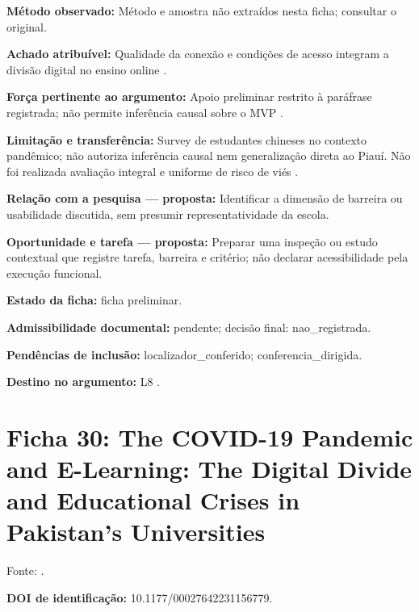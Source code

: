 \noindent\textbf{Método observado:} Método e amostra não extraídos nesta ficha; consultar o original.\par\medskip

\noindent\textbf{Achado atribuível:} Qualidade da conexão e condições de acesso integram a divisão digital no ensino online \citep{guo2022}.\par\medskip

\noindent\textbf{Força pertinente ao argumento:} Apoio preliminar restrito à paráfrase registrada; não permite inferência causal sobre o MVP \citep{guo2022}.\par\medskip

\noindent\textbf{Limitação e transferência:} Survey de estudantes chineses no contexto pandêmico; não autoriza inferência causal nem generalização direta ao Piauí. Não foi realizada avaliação integral e uniforme de risco de viés \citep{guo2022}.\par\medskip

\noindent\textbf{Relação com a pesquisa — proposta:} Identificar a dimensão de barreira ou usabilidade discutida, sem presumir representatividade da escola.\par\medskip

\noindent\textbf{Oportunidade e tarefa — proposta:} Preparar uma inspeção ou estudo contextual que registre tarefa, barreira e critério; não declarar acessibilidade pela execução funcional.\par\medskip

\noindent\textbf{Estado da ficha:} ficha preliminar.\par\medskip

\noindent\textbf{Admissibilidade documental:} pendente; decisão final: nao\_registrada.\par\medskip

\noindent\textbf{Pendências de inclusão:} localizador\_conferido; conferencia\_dirigida.\par\medskip

\noindent\textbf{Destino no argumento:} L8 .

\clearpage\section*{Ficha 30: The COVID-19 Pandemic and E-Learning: The Digital Divide and Educational Crises in Pakistan’s Universities}

Fonte: \citet{jamil2023}.

\noindent\textbf{DOI de identificação:} 10.1177/00027642231156779.\par\medskip

